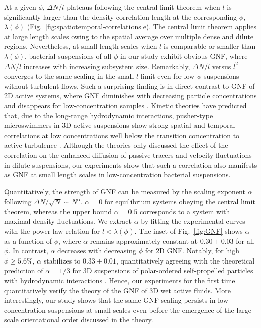\documentclass[twocolumn,aps,prx,amsmath,amssymb,longbibliography,superscriptaddress]{revtex4-2}
\begin{document}
At a given $\phi$, $\Delta N/l$ plateaus following the central limit theorem when $l$ is significantly larger than the density correlation length at the corresponding $\phi$, $\lambda(\phi)$ (Fig.~\ref{fig:spatiotemporal-correlations}e). The central limit theorem applies at large length scales owing to the spatial average over multiple dense and dilute regions. Nevertheless, at small length scales when $l$ is comparable or smaller than $\lambda(\phi)$, bacterial suspensions of all $\phi$ in our study exhibit obvious GNF, where $\Delta N/l$ increases with increasing subsystem size. Remarkably, $\Delta N/l$ versus $l^2$ converges to the same scaling in the small $l$ limit even for low-$\phi$ suspensions without turbulent flows. Such a surprising finding is in direct contrast to GNF of 2D active systems, where GNF diminishes with decreasing particle concentrations and disappears for low-concentration samples \cite{Narayan2007,Aranson2008,Kudrolli2008,Deseigne2010,Zhang2010,Schaller2013}. Kinetic theories have predicted that, due to the long-range hydrodynamic interactions, pusher-type microswimmers in 3D active suspensions show strong spatial and temporal correlations at low concentrations well below the transition concentration to active turbulence \cite{Stenhammar2017,Nambiar2021}. Although the theories only discussed the effect of the correlation on the enhanced diffusion of passive tracers and velocity fluctuations in dilute suspensions, our experiments show that such a correlation also manifests as GNF at small length scales in low-concentration bacterial suspensions.


Quantitatively, the strength of GNF can be measured by the scaling exponent $\alpha$ following $\Delta N/\sqrt{N} \sim N^\alpha$. $\alpha=0$ for equilibrium systems obeying the central limit theorem, whereas the upper bound $\alpha = 0.5$ corresponds to a system with maximal density fluctuations.
We extract $\alpha$ by fitting the experimental curves with the power-law relation for $l < \lambda(\phi)$. The inset of Fig.~\ref{fig:GNF} shows $\alpha$ as a function of $\phi$, where $\alpha$ remains approximately constant at $0.30 \pm 0.03$ for all $\phi$. In contrast, $\alpha$ decreases with decreasing $\phi$ for 2D GNF. Notably, for high $\phi \geq 5.6\%$, $\alpha$ stabilizes to $0.33 \pm 0.01$, quantitatively agreeing with the theoretical prediction of $\alpha = 1/3$ for 3D suspensions of polar-ordered self-propelled particles with hydrodynamic interactions \cite{AditiSimha2002}. Hence, our experiments for the first time quantitatively verify the theory of the GNF of 3D wet active fluids. More interestingly, our study shows that the same GNF scaling persists in low-concentration suspensions at small scales even before the emergence of the large-scale orientational order discussed in the theory.
\end{document}
